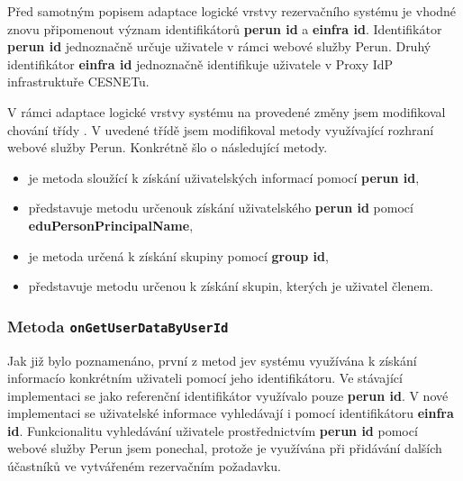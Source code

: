 \documentclass[
  printed, %
  twoside, %
  table,   %
  nolof,     %
  nolot,     %
]{fithesis3}
\begin{document}
\par
Před samotným popisem adaptace logické vrstvy rezervačního systému  je vhodné znovu připomenout význam identifikátorů \textbf{perun id} a \textbf{einfra id}. Identifikátor \textbf{perun id} jednoznačně určuje uživatele v rámci webové služby Perun. Druhý identifikátor \textbf{einfra id} jednoznačně identifikuje uživatele v Proxy IdP infrastruktuře CESNETu. 
\par V rámci adaptace logické vrstvy systému  na provedené změny jsem modifikoval chování třídy . V uvedené třídě jsem modifikoval metody využívající rozhraní webové služby Perun. Konkrétně šlo o následující metody. 
\begin{itemize}
    \item {} je metoda sloužící k získání uživatelských informací pomocí \textbf{perun id}, 
    \item {} představuje metodu určenou\break k získání uživatelského \textbf{perun id} pomocí \textbf{eduPersonPrincipalName},
    \item {} je metoda určená k získání skupiny pomocí \textbf{group id},
    \item {} představuje metodu určenou k získání skupin, kterých je uživatel členem. 
\end{itemize}



\subsubsection{Metoda \texttt{onGetUserDataByUserId}}

Jak již bylo poznamenáno, první z metod  je\break v systému  využívána k získání informací\break o konkrétním uživateli pomocí jeho identifikátoru. Ve stávající implementaci se jako referenční identifikátor využívalo pouze \textbf{perun id}. V nové implementaci se uživatelské informace vyhledávají i pomocí identifikátoru \textbf{einfra id}. Funkcionalitu vyhledávání uživatele prostřednictvím \textbf{perun id} pomocí webové služby Perun jsem ponechal, protože je využívána při přidávání dalších účastníků ve vytvářeném rezervačním požadavku. 

\par 
\end{document}
